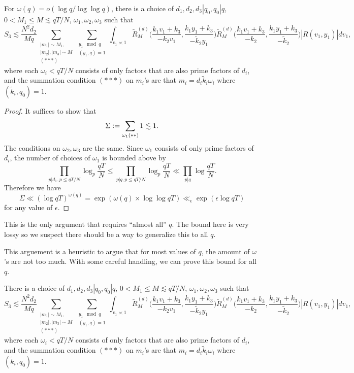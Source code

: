 \begin{corollary}\label{almostallek}
    For $\omega(q)=o(\log q /\log\log q)$, there is a choice of $d_1,d_2,d_3|q_0, q_0|q$, $0<M_1\leq M\lesssim qT/N$, $\omega_1,\omega_2,\omega_3$ such that  \[
        S_3\lesssim \frac{N^2d_2}{Mq} 
        \sum_{\substack{|m_1|\sim M_1,\\|m_2|,|m_3|\sim M\\
        (***)}}\sum_{\substack{y_1\mod q\\ (y_1,q)=1} }\int_{v_1\asymp 1}
        \tilde{R}_M^{(d)}\Big(\frac{k_1v_1+k_3}{-k_2v_1},\frac{k_1y_1+k_3}{-\tilde{k}_2y_1}\Big)\tilde{R}_M^{(d)}\Big(\frac{k_1v_1+k_3}{-k_2},\frac{k_1y_1+k_3}{-\tilde{k}_2}\Big)|R\left(v_1,y_1\right)| dv_1,
    \]
    where each $\omega_i<qT/N$ consists of only factors that are also prime factors of $d_i$, and the summation condition $(***)$ on $m_i$'s are that
    $m_i=d_i\tilde{k}_i\omega_i$ where $(\tilde{k}_i,q_0)=1$. 
\end{corollary}
\begin{proof}
    It suffices to show that \[
   \Sigma\mathrel{\mathop:}= \sum_{\omega_1 (**)} 1 \lesssim 1.
    \]
    The conditions on $\omega_2,\omega_3$ are the same. Since $\omega_1$ consists of only prime factors of $d_i$, the number of choices of $\omega_1$ is bounded above by\[
    \prod_{p|d_1, p\leq qT/N}\log_{p} \frac{qT}{N}\leq \prod_{p|q,p\leq qT/N}\log_{p} \frac{qT}{N} \ll \prod_{p|q} \log \frac{qT}{N}.
    \]
    Therefore we have \[
    \Sigma \ll (\log qT)^{\omega(q)} = \exp(\omega(q) \times \log \log qT) \ll_{\epsilon} \exp(\epsilon \log qT)
    \]
    for any value of $\epsilon$.
\end{proof}
\begin{remark}
    This is the only argument that requires ``almost all'' $q$. The bound here is very lossy so we suspect there should be a way to generalize this to all $q$.
\end{remark}
This arguement is a heuristic to argue that for most values of $q$, the amount of $\omega$'s are not too much. With some careful handling, we can prove this bound for all $q$.
\begin{proposition}\label{allek}
   There is a choice of $d_1,d_2,d_3|q_0, q_0|q$, $0<M_1\leq M\lesssim qT/N$, $\omega_1,\omega_2,\omega_3$ such that  \[
        S_3\lesssim \frac{N^2d_2}{Mq} 
        \sum_{\substack{|m_1|\sim M_1,\\|m_2|,|m_3|\sim M\\
        (***)}}\sum_{\substack{y_1\mod q\\ (y_1,q)=1} }\int_{v_1\asymp 1}
        \tilde{R}_M^{(d)}\Big(\frac{k_1v_1+k_3}{-k_2v_1},\frac{k_1y_1+k_3}{-\tilde{k}_2y_1}\Big)\tilde{R}_M^{(d)}\Big(\frac{k_1v_1+k_3}{-k_2},\frac{k_1y_1+k_3}{-\tilde{k}_2}\Big)|R\left(v_1,y_1\right)| dv_1,
    \]
    where each $\omega_i<qT/N$ consists of only factors that are also prime factors of $d_i$, and the summation condition $(***)$ on $m_i$'s are that
    $m_i=d_i\tilde{k}_i\omega_i$ where $(\tilde{k}_i,q_0)=1$. 
\end{proposition}
